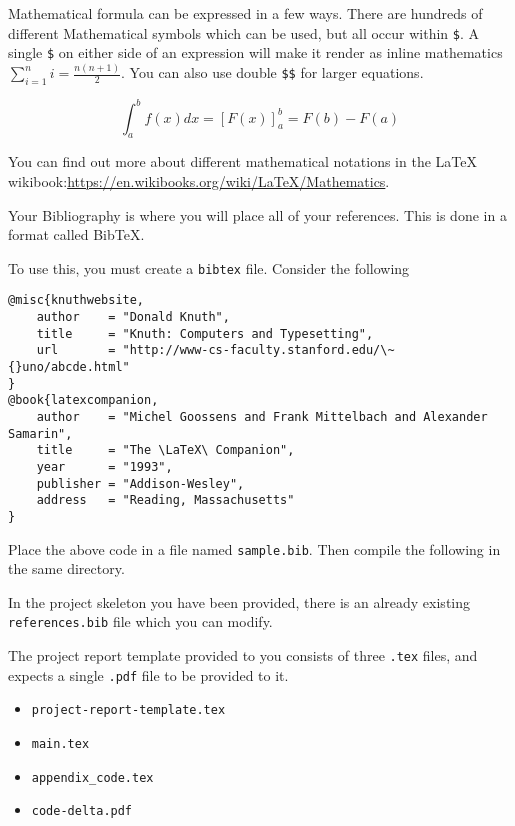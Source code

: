 
Mathematical formula can be expressed in a few ways. There are hundreds of different Mathematical symbols which can be used, but all occur within \verb|$|. A single \verb|$| on either side of an expression will make it render as inline mathematics $\sum_{i=1}^{n}i=\frac{n(n+1)}{2}$. You can also use double \verb|$$| for larger equations.

$$\int_{a}^{b}f(x)dx=\left[F(x)\right]_{a}^{b}=F(b)-F(a)$$

You can find out more about different mathematical notations in the \LaTeX{} wikibook:\url{https://en.wikibooks.org/wiki/LaTeX/Mathematics}.



Your Bibliography is where you will place all of your references. This is done in a format called BibTeX.

To use this, you must create a \verb|bibtex| file. Consider the following

\begin{lstlisting}[language={}]
@misc{knuthwebsite,
    author    = "Donald Knuth",
    title     = "Knuth: Computers and Typesetting",
    url       = "http://www-cs-faculty.stanford.edu/\~{}uno/abcde.html"
}
@book{latexcompanion,
    author    = "Michel Goossens and Frank Mittelbach and Alexander Samarin",
    title     = "The \LaTeX\ Companion",
    year      = "1993",
    publisher = "Addison-Wesley",
    address   = "Reading, Massachusetts"
}
\end{lstlisting}

Place the above code in a file named \verb|sample.bib|. Then compile the following in the same directory.


In the project skeleton you have been provided, there is an already existing \verb|references.bib| file which you can modify.


The project report template provided to you consists of three \verb|.tex| files, and expects a single \verb|.pdf| file to be provided to it.

\begin{itemize}
    \item \verb|project-report-template.tex|
    \item \verb|main.tex|
    \item \verb|appendix_code.tex|
    \item \verb|code-delta.pdf|
\end{itemize}

